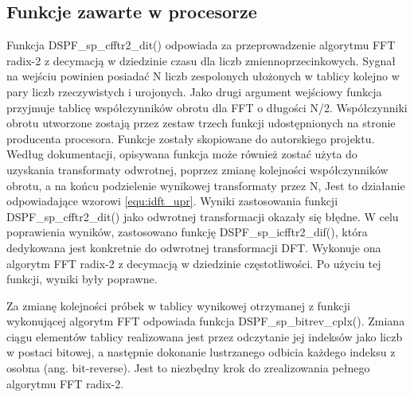 \subsection{Funkcje zawarte w procesorze}
Funkcja DSPF\_sp\_cfftr2\_dit() odpowiada za przeprowadzenie algorytmu FFT radix-2 z decymacją w dziedzinie czasu dla liczb zmiennoprzecinkowych. Sygnał na wejściu powinien posiadać N liczb zespolonych ułożonych w tablicy kolejno w pary liczb rzeczywistych i urojonych. Jako drugi argument wejściowy funkcja przyjmuje tablicę współczynników obrotu dla FFT o długości N/2. Współczynniki obrotu utworzone zostają przez zestaw trzech funkcji udostępnionych na stronie producenta procesora. Funkcje zostały skopiowane do autorskiego projektu. %
Według dokumentacji, opisywana funkcja może również zostać użyta do uzyskania transformaty odwrotnej, poprzez zmianę kolejności współczynników obrotu, a na końcu podzielenie wynikowej transformaty przez N, Jest to działanie odpowiadające wzorowi \ref{equ:idft_upr}. Wyniki zastosowania funkcji DSPF\_sp\_cfftr2\_dit() jako odwrotnej transformacji okazały się błędne. W celu poprawienia wyników, zastosowano funkcję DSPF\_sp\_icfftr2\_dif(), która dedykowana jest konkretnie do odwrotnej transformacji DFT. Wykonuje ona algorytm FFT radix-2 z decymacją w dziedzinie częstotliwości. Po użyciu tej funkcji, wyniki były poprawne.

Za zmianę kolejności próbek w tablicy wynikowej otrzymanej z funkcji wykonującej algorytm FFT odpowiada funkcja DSPF\_sp\_bitrev\_cplx(). Zmiana ciągu elementów tablicy realizowana jest przez odczytanie jej indeksów jako liczb w postaci bitowej, a następnie dokonanie lustrzanego odbicia każdego indeksu z osobna (ang. bit-reverse). Jest to niezbędny krok do zrealizowania pełnego algorytmu FFT radix-2.

